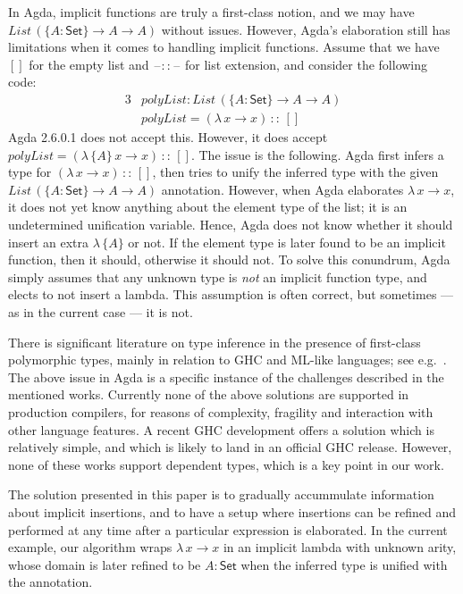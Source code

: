 \documentclass[acmsmall,review,anonymous,prologue,dvipsnames]{acmart}\settopmatter{printfolios=true,printccs=false,printacmref=false}
\newcommand{\blank}{\mathord{\hspace{1pt}\text{--}\hspace{1pt}}}
\newcommand{\kw}[1]{{\mathsf{#1}}}
\newcommand{\mi}[1]{\mathit{#1}}
\theoremstyle{remark}
\begin{document}
In Agda, implicit functions are truly a first-class notion, and we may have
$List\,(\{A : \kw{Set}\}\to A \to A)$ without issues. However, Agda's elaboration
still has limitations when it comes to handling implicit functions. Assume that
we have $[]$ for the empty list and $\blank::\blank$ for list extension,
and consider the following code:
\begin{alignat*}{3}
  & \mi{polyList} : List\,(\{A : \kw{Set}\}\to A \to A)\\
  & \mi{polyList} = (\lambda\,x \to x)\,::\,[]
\end{alignat*}
Agda 2.6.0.1 does not accept this. However, it does accept $\mi{polyList} =
(\lambda\,\{A\}\,x \to x)\,::\,[]$. The issue is the following. Agda first
infers a type for $(\lambda\,x \to x)\,::\,[]$, then tries to unify the
inferred type with the given $List\,(\{A : \kw{Set}\}\to A \to A)$
annotation. However, when Agda elaborates $\lambda\,x \to x$, it does not yet
know anything about the element type of the list; it is an undetermined
unification variable. Hence, Agda does not know whether it should insert an
extra $\lambda\,\{A\}$ or not. If the element type is later found to be an
implicit function, then it should, otherwise it should not. To solve this
conundrum, Agda simply assumes that any unknown type is \emph{not} an implicit
function type, and elects to not insert a lambda. This assumption is often
correct, but sometimes --- as in the current case --- it is not.

There is significant literature on type inference in the presence of first-class
polymorphic types, mainly in relation to GHC and ML-like languages; see
e.g.\ \cite{leijen2008hmf,leijen2009flexible,serrano2018guarded,vytiniotis2006boxy}.
The above issue in Agda is a specific instance of the challenges described in
the mentioned works. Currently none of the above solutions are supported in
production compilers, for reasons of complexity, fragility and interaction with
other language features. A recent GHC development \cite{serrano2020a} offers a
solution which is relatively simple, and which is likely to land in an official
GHC release. However, none of these works support dependent types, which is a
key point in our work.

The solution presented in this paper is to gradually accummulate information
about implicit insertions, and to have a setup where insertions can be refined
and performed at any time after a particular expression is elaborated. In the
current example, our algorithm wraps $\lambda\,x\to x$ in an implicit lambda
with unknown arity, whose domain is later refined to be $A : \kw{Set}$ when the
inferred type is unified with the annotation.
\end{document}
